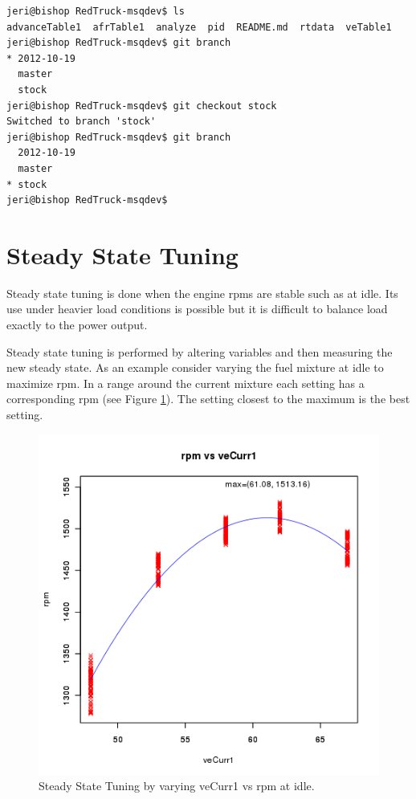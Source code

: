 \documentclass{article}
\begin{document}
\begin{verbatim}
jeri@bishop RedTruck-msqdev$ ls
advanceTable1  afrTable1  analyze  pid  README.md  rtdata  veTable1
jeri@bishop RedTruck-msqdev$ git branch
* 2012-10-19
  master
  stock
jeri@bishop RedTruck-msqdev$ git checkout stock
Switched to branch 'stock'
jeri@bishop RedTruck-msqdev$ git branch
  2012-10-19
  master
* stock
jeri@bishop RedTruck-msqdev$
\end{verbatim}

\section{Steady State Tuning}
\label{sec:steadytun}

Steady state tuning is done when the engine rpms are stable such as
at idle.
Its use under heavier load conditions is possible but it is difficult to
balance load exactly to the power output.

Steady state tuning is performed by altering variables and then measuring
the new steady state.
As an example consider varying the fuel mixture at idle to maximize rpm.
In a range around the current mixture each setting has a corresponding
rpm (see Figure \ref{fig:sstrpm}).
The setting closest to the maximum is the best setting.

\begin{figure}[tbp]
\center
\includegraphics[scale=0.5]{plot01}
\caption{Steady State Tuning by varying veCurr1 vs rpm at idle.}
\label{fig:sstrpm}
\end{figure}
\end{document}
